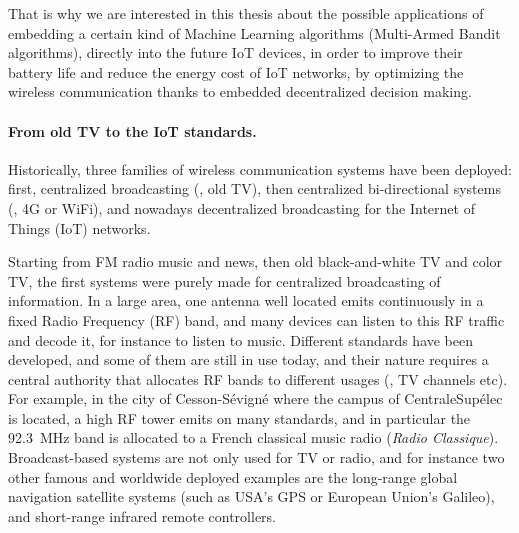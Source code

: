 That is why we are interested in this thesis about the possible applications of embedding a certain kind of Machine Learning algorithms (Multi-Armed Bandit algorithms),
directly into the future IoT devices, in order to improve their battery life and reduce the energy cost of IoT networks, by optimizing the wireless communication thanks to embedded decentralized decision making.


\paragraph{From old TV to the IoT standards.}
%
Historically, three families of wireless communication systems have been deployed: first, centralized broadcasting (\eg, old TV), then centralized bi-directional systems (\eg, 4G or WiFi), and nowadays decentralized broadcasting for the Internet of Things (IoT) networks.

Starting from FM radio music and news, then old black-and-white TV and color TV, the first systems were purely made for centralized broadcasting of information. In a large area, one antenna well located emits continuously in a fixed Radio Frequency (RF) band, and many devices can listen to this RF traffic and decode it, for instance to listen to music.
Different standards have been developed, and some of them are still in use today, and their nature requires a central authority that allocates RF bands to different usages (\eg, TV channels etc).
For example, in the city of Cesson-Sévigné where the campus of CentraleSupélec is located, a high RF tower emits on many standards, and in particular the \SI{92.3}{\mega\hertz} band is allocated to a French classical music radio (\emph{Radio Classique}).
Broadcast-based systems are not only used for TV or radio,
and for instance two other famous and worldwide deployed examples are the long-range global navigation satellite systems (such as USA's GPS or European Union's Galileo), and short-range infrared remote controllers.

